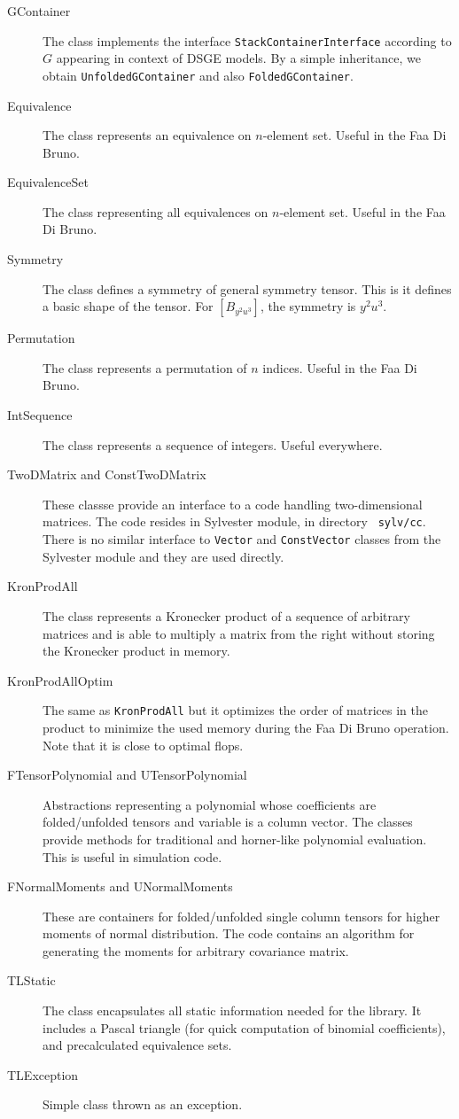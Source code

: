 \documentclass[11pt,a4paper]{article}
\begin{document}
\begin{description}
\item[GContainer] 
The class implements the interface \texttt{StackContainerInterface} according
to $G$ appearing in context of DSGE models. By a simple inheritance,
we obtain \texttt{UnfoldedGContainer} and also \texttt{FoldedGContainer}.
\item[Equivalence] 
The class represents an equivalence on $n$-element set. Useful in the
Faa Di Bruno.
\item[EquivalenceSet] 
The class representing all equivalences on $n$-element set. Useful in the
Faa Di Bruno.
\item[Symmetry] 
The class defines a symmetry of general symmetry tensor. This is it
defines a basic shape of the tensor. For $\left[B_{y^2u^3}\right]$,
the symmetry is $y^2u^3$.
\item[Permutation] 
The class represents a permutation of $n$ indices. Useful in the
Faa Di Bruno.
\item[IntSequence] 
The class represents a sequence of integers. Useful everywhere.
\item[TwoDMatrix and ConstTwoDMatrix] 
These classse provide an interface to a code handling two-dimensional
matrices. The code resides in Sylvester module, in directory {\tt
sylv/cc}. There is
no similar interface to \texttt{Vector} and \texttt{ConstVector} classes from the
Sylvester module and they are used directly.
\item[KronProdAll] 
The class represents a Kronecker product of a sequence of arbitrary
matrices and is able to multiply a matrix from the right without
storing the Kronecker product in memory.
\item[KronProdAllOptim] 
The same as \texttt{KronProdAll} but it optimizes the order of matrices in
the product to minimize the used memory during the Faa Di Bruno
operation. Note that it is close to optimal flops.
\item[FTensorPolynomial and UTensorPolynomial] 
Abstractions representing a polynomial whose coefficients are
folded/unfolded tensors and variable is a column vector. The classes
provide methods for traditional and horner-like polynomial
evaluation. This is useful in simulation code.
\item[FNormalMoments and UNormalMoments] 
These are containers for folded/unfolded single column tensors for
higher moments of normal distribution. The code contains an algorithm
for generating the moments for arbitrary covariance matrix.
\item[TLStatic] 
The class encapsulates all static information needed for the
library. It includes a Pascal triangle (for quick computation of
binomial coefficients), and precalculated equivalence sets.
\item[TLException] 
Simple class thrown as an exception.
\end{description}
\end{document}
